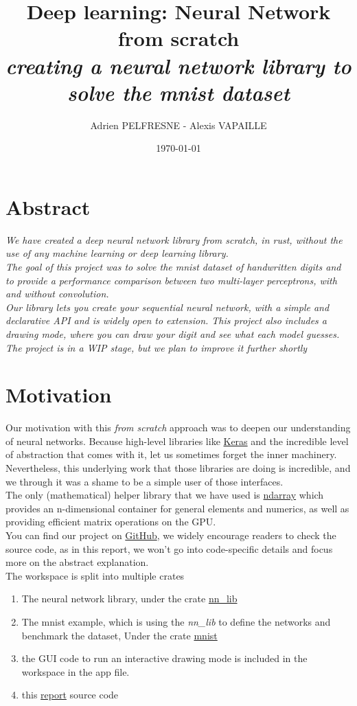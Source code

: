 \documentclass[a4paper, twocolumn, twoside]{article}
\title{Deep learning: Neural Network from scratch\\
\textit{creating a neural network library to solve the mnist dataset}}
\author{Adrien PELFRESNE - Alexis VAPAILLE}
\date{\today}
\begin{document}
	\onecolumn
    \maketitle
	\tableofcontents

	\twocolumn
	\section{Abstract}
	\textit{We have created a deep neural network library from scratch, in rust, without the use of any machine learning or deep learning library.\\
	The goal of this project was to solve the mnist dataset of handwritten digits and to provide a performance comparison between
	two multi-layer perceptrons, with and without convolution.\\
	Our library lets you create your sequential neural network, with a simple and declarative API and is widely open to extension.
	This project also includes a drawing mode, where you can draw your digit and see what each model guesses. The project is in a WIP stage, but we plan to improve it further shortly
	}

	\section{Motivation}
	Our motivation with this \textit{from scratch} approach was to deepen our understanding of neural networks.
	Because high-level libraries like \href{https://keras.io/}{Keras} and the incredible level of abstraction that comes with it,
	let us sometimes forget the inner machinery. Nevertheless,
	this underlying work that those libraries are doing is incredible, and we through it was a shame to be a simple user of those interfaces.\\
	The only (mathematical) helper library that we have used is \href{https://crates.io/crates/ndarray}{ndarray}
	which provides an n-dimensional container for general elements
	and numerics, as well as providing efficient matrix operations on the GPU.\\
	You can find our project on \href{https://github.com/dirdr/neural_network_from_scratch}{GitHub}, we widely encourage readers to check the source code,
	as in this report, we won't go into code-specific details and focus more on the abstract explanation.\\
	The workspace is split into multiple crates
	\begin{enumerate}
		\item The neural network library, under the crate \href{https://github.com/dirdr/neural_network_from_scratch/tree/main/nn_lib}{nn\_lib}
		\item The mnist example, which is using the \textit{nn\_lib} to define the networks and benchmark the dataset, Under the crate  \href{https://github.com/dirdr/neural_network_from_scratch/tree/main/mnist}{mnist}
		\item the GUI code to run an interactive drawing mode is included in the workspace in the app file.
            \item this \href{https://github.com/dirdr/neural_network_from_scratch/tree/main/report}{report} source code
	\end{enumerate}
\end{document}
